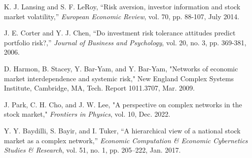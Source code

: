 \documentclass[letterpaper, 10 pt, proceedings]{ieeetran}  %
\begin{document}
\begin{thebibliography}{99}
		K. J. Lansing and S. F. LeRoy, “Risk aversion, investor information and stock market volatility,” \textit{European Economic Review}, vol. 70, pp. 88-107, July 2014. 
		
		J. E. Corter and Y. J. Chen, “Do investment risk tolerance attitudes predict portfolio risk?,” \textit{Journal of Business and Psychology}, vol. 20, no. 3, pp. 369-381, 2006.
		
		D. Harmon, B. Stacey, Y. Bar-Yam, and Y. Bar-Yam, "Networks of economic market interdependence and systemic risk," New England Complex Systems Institute, Cambridge, MA, Tech. Report 1011.3707, Mar. 2009.
		
		J. Park, C. H. Cho, and J. W. Lee, "A perspective on complex networks in the stock market," \textit{Frontiers in Physics}, vol. 10, Dec. 2022. %
		
		Y. Y. Baydilli, S. Bayir, and I. Tuker, “A hierarchical view of a national stock market as a complex network,” \textit{Economic Computation \& Economic Cybernetics Studies \& Research}, vol. 51, no. 1, pp. 205–222, Jan. 2017.


	\end{thebibliography}
	
	
\end{document}
